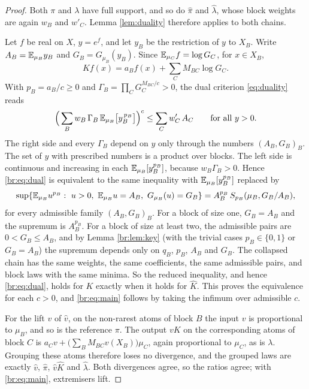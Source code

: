 \begin{proof}
Both \(\pi\) and \(\lambda\) have full support, and so do \(\widehat\pi\)
and \(\widehat\lambda\), whose block weights are again \(w_B\) and
\(w'_C\). Lemma \ref{lem:duality} therefore applies to both chains.

Let \(f\) be real on \(X\), \(y=e^f\), and let \(y_B\) be the restriction of
\(y\) to \(X_B\). Write \(A_B=\mathbb E_{\mu_B}y_B\) and \(G_B=G_{\mu_B}(y_B)\).
Since \(\mathbb E_{\mu_C}f=\log G_C\), for \(x\in X_B\),
\[
Kf(x)=a_Bf(x)+\sum_CM_{BC}\log G_C .
\]
With \(p_B=a_B/c\ge0\) and \(\Gamma_B=\prod_CG_C^{M_{BC}/c}>0\), the dual
criterion \eqref{eq:duality} reads
\begin{equation}\label{br:eq:dual}
\Big(\sum_Bw_B\,\Gamma_B\,\mathbb E_{\mu_B}\big[y_B^{\,p_B}\big]\Big)^{c}
\le\sum_Cw'_C\,A_C\qquad\text{for all }y>0 .
\end{equation}
The right side and every \(\Gamma_B\) depend on \(y\) only through the
numbers \((A_B,G_B)_B\). The set of \(y\) with prescribed numbers is a
product over blocks. The left side is continuous and increasing in each
\(\mathbb E_{\mu_B}[y_B^{p_B}]\), because \(w_B\Gamma_B>0\). Hence
\eqref{br:eq:dual} is equivalent to the same inequality with
\(\mathbb E_{\mu_B}[y_B^{p_B}]\) replaced by
\[
\sup\{\E_{\mu_B}u^{p_B}:\ u>0,\ \E_{\mu_B}u=A_B,\ G_{\mu_B}(u)=G_B\}
=A_B^{p_B}\,S_{p_B}(\mu_B,G_B/A_B),
\]
for every admissible family \((A_B,G_B)_B\). For a block of size one,
\(G_B=A_B\) and the supremum is \(A_B^{p_B}\). For a block of size at least
two, the admissible pairs are \(0<G_B\le A_B\), and by Lemma
\ref{br:lem:key} (with the trivial cases \(p_B\in\{0,1\}\) or \(G_B=A_B\)) the
supremum depends only on \(q_B\), \(p_B\), \(A_B\) and \(G_B\). The collapsed
chain has the same weights, the same coefficients, the same admissible
pairs, and block laws with the same minima. So the reduced inequality, and
hence \eqref{br:eq:dual}, holds for \(K\) exactly when it holds for
\(\widehat K\). This proves the equivalence for each \(c>0\), and
\eqref{br:eq:main} follows by taking the infimum over admissible \(c\).

For the lift \(v\) of \(\widehat v\), on the non-rarest atoms of block \(B\)
the input \(v\) is proportional to \(\mu_B\), and so is the reference
\(\pi\). The output \(vK\) on the corresponding atoms of block \(C\) is
\(a_Cv+\big(\sum_BM_{BC}v(X_B)\big)\mu_C\), again proportional to \(\mu_C\),
as is \(\lambda\). Grouping these atoms therefore loses no divergence, and
the grouped laws are exactly \(\widehat v\), \(\widehat\pi\),
\(\widehat v\widehat K\) and \(\widehat\lambda\). Both divergences agree,
so the ratios agree; with \eqref{br:eq:main}, extremisers lift.
\end{proof}

